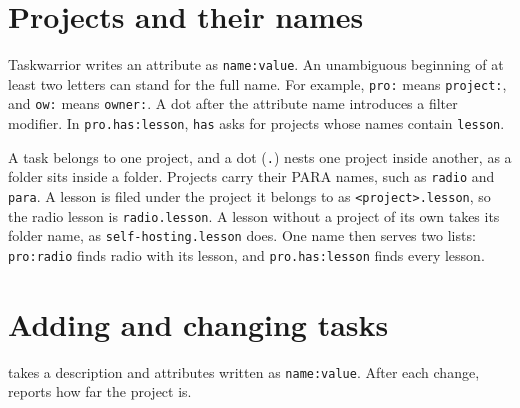 \documentclass[11pt,a4paper]{article}
\begin{document}
\section*{Projects and their names}

Taskwarrior writes an attribute as \texttt{name:value}. An unambiguous beginning of at least two letters can stand for the full name. For example, \texttt{pro:} means \texttt{project:}, and \texttt{ow:} means \texttt{owner:}. A dot after the attribute name introduces a filter modifier. In \texttt{pro.has:lesson}, \texttt{has} asks for projects whose names contain \texttt{lesson}.

A task belongs to one project, and a dot (\texttt{.}) nests one project inside another, as a folder sits inside a folder. Projects carry their PARA names, such as \texttt{radio} and \texttt{para}. A lesson is filed under the project it belongs to as \texttt{<project>.lesson}, so the radio lesson is \texttt{radio.lesson}. A lesson without a project of its own takes its folder name, as \texttt{self-hosting.lesson} does. One name then serves two lists: \texttt{pro:radio} finds radio with its lesson, and \texttt{pro.has:lesson} finds every lesson.

\section*{Adding and changing tasks}

 takes a description and attributes written as \texttt{name:value}. After each change,  reports how far the project is.
\end{document}
